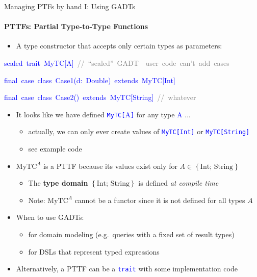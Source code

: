 \documentclass[english]{beamer}
\newenvironment{lyxcode}
   {\par\begin{list}{}{
     \setlength{\rightmargin}{\leftmargin}
     \setlength{\listparindent}{0pt}%
     \raggedright
     \setlength{\itemsep}{0pt}
     \setlength{\parsep}{0pt}
     \normalfont\ttfamily}%
    \def\{{\char`\{}
    \def\}{\char`\}}
    \def\textasciitilde{\char`\~}
    \item[]}
   {\end{list}}
\begin{document}
\begin{frame}{Managing PTFs by hand I: Using GADTs}


\framesubtitle{PTTFs: Partial Type-to-Type Functions}
\begin{itemize}
\item A type constructor that accepts only certain types as parameters:
\end{itemize}
\begin{lyxcode}
\textcolor{blue}{\footnotesize{}sealed~trait~MyTC{[}A{]}~}\textrm{\textcolor{gray}{\footnotesize{}//~``sealed''~GADT~\textendash{}~user~code~can't~add~cases}}{\footnotesize \par}

\textcolor{blue}{\footnotesize{}final~case~class~Case1(d:~Double)~extends~MyTC{[}Int{]}}{\footnotesize \par}

\textcolor{blue}{\footnotesize{}final~case~class~Case2()~extends~MyTC{[}String{]}}\textrm{\textcolor{gray}{\footnotesize{}~//~whatever}}{\footnotesize \par}
\end{lyxcode}
\begin{itemize}
\item It looks like we have defined \texttt{\textcolor{blue}{\footnotesize{}MyTC{[}}}\textcolor{blue}{\footnotesize{}A}\texttt{\textcolor{blue}{\footnotesize{}{]}}}
for any type \textcolor{blue}{\footnotesize{}A} ...
\begin{itemize}
\item actually, we can only ever create values of \texttt{\textcolor{blue}{\footnotesize{}MyTC{[}Int{]}}}
or \texttt{\textcolor{blue}{\footnotesize{}MyTC{[}String{]}}}{\footnotesize \par}
\item see example code
\end{itemize}
\item $\text{MyTC}^{A}$ is a PTTF because its values exist only for $A\in\left\{ \text{Int};\,\text{String}\right\} $
\begin{itemize}
\item The \textbf{type domain} $\left\{ \text{Int};\,\text{String}\right\} $
is defined \emph{at compile time}
\item Note: $\text{MyTC}^{A}$ cannot be a functor since it is not defined
for all types $A$
\end{itemize}
\item When to use GADTs:
\begin{itemize}
\item for domain modeling (e.g.\ queries with a fixed set of result types)
\item for DSLs that represent typed expressions
\end{itemize}
\item Alternatively, a PTTF can be a \texttt{\textcolor{blue}{\footnotesize{}trait}}
with some implementation code
\end{itemize}
\end{frame}
\end{document}
